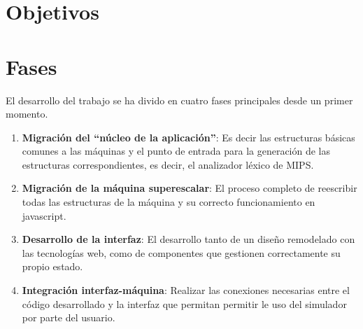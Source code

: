 
\section{Objetivos}
\label{4:sec1}

\section{Fases}
\label{4:sec2}

El desarrollo del trabajo se ha divido en cuatro fases principales desde un
primer momento.

\begin{enumerate}
   \item \textbf{Migración del “núcleo de la aplicación”}: Es decir las estructuras básicas 
   comunes a las máquinas y el punto de entrada para la generación de las estructuras 
   correspondientes, es decir, el analizador léxico de MIPS.

   \item \textbf{Migración de la máquina superescalar}: El proceso completo de reescribir 
   todas las estructuras de la máquina y su correcto funcionamiento en javascript.

   \item \textbf{Desarrollo de la interfaz}: El desarrollo tanto de un diseño remodelado 
   con las tecnologías web, como de componentes que gestionen correctamente su propio estado.
   
   \item \textbf{Integración interfaz-máquina}: Realizar las conexiones necesarias entre el 
   código desarrollado y la interfaz que permitan permitir le uso del simulador por parte del usuario.

\end{enumerate}


